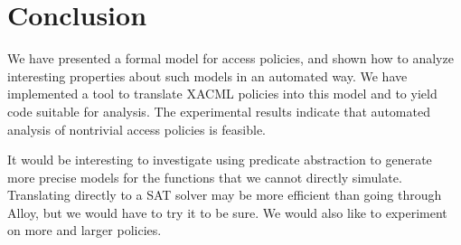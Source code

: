 \section{Conclusion}

We have presented a formal model for access policies, and shown how to
analyze interesting properties about such models in an automated way.
We have implemented a tool to translate XACML policies into this model
and to yield code suitable for analysis.  The experimental results
indicate that automated analysis of nontrivial access policies is
feasible.

It would be interesting to investigate using predicate abstraction to
generate more precise models for the functions that we cannot directly
simulate.  Translating directly to a SAT solver may be more efficient
than going through Alloy, but we would have to try it to be sure.  We
would also like to experiment on more and larger policies.


